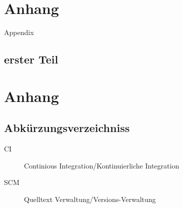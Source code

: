 \appendix
\chapter{Anhang}
Appendix
\section{erster Teil}
\chapter{Anhang}
\section{Abk\"urzungsverzeichniss}
\begin{description}
  \item[CI] Continious Integration/Kontinuierliche Integration
  \item[SCM] Quelltext Verwaltung/Versions-Verwaltung
\end{description}

